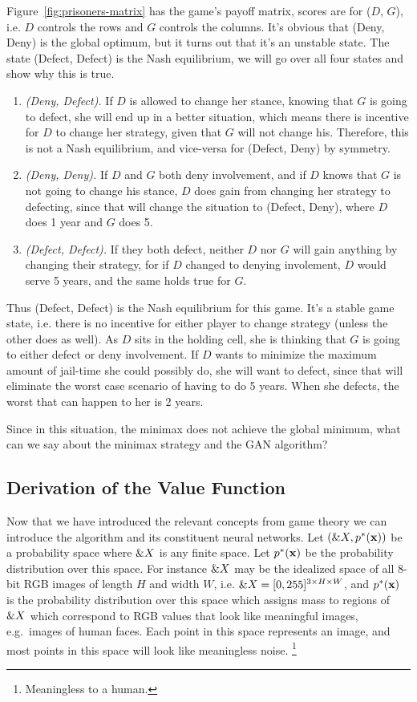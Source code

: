 Figure~\ref{fig:prisoners-matrix} has the game's payoff matrix, scores
are for ($D$, $G$), i.e. $D$ controls the rows and $G$ controls the
columns. It's obvious that (Deny, Deny) is the global optimum, but it
turns out that it's an unstable state. The state (Defect, Defect) is
the Nash equilibrium, we will go over all four states and show why
this is true.

\begin{enumerate}
\item \textit{(Deny, Defect).} If $D$ is allowed to change her stance,
  knowing that $G$ is going to defect, she will end up in a better
  situation, which means there is incentive for $D$ to change her
  strategy, given that $G$ will not change his. Therefore, this is not
  a Nash equilibrium, and vice-versa for (Defect, Deny) by symmetry.
\item \textit{(Deny, Deny).} If $D$ and $G$ both deny involvement, and
  if $D$ knows that $G$ is not going to change his stance, $D$ does
  gain from changing her strategy to defecting, since that will change
  the situation to (Defect, Deny), where $D$ does 1 year and $G$ does
  5.
\item \textit{(Defect, Defect).} If they both defect, neither $D$ nor
  $G$ will gain anything by changing their strategy, for if $D$
  changed to denying involement, $D$ would serve 5 years, and the same
  holds true for $G$.
\end{enumerate}

Thus (Defect, Defect) is the Nash equilibrium for this game. It's a
stable game state, i.e. there is no incentive for either player to
change strategy (unless the other does as well). As $D$ sits in the
holding cell, she is thinking that $G$ is going to either defect or
deny involvement. If $D$ wants to minimize the maximum amount of
jail-time she could possibly do, she will want to defect, since that
will eliminate the worst case scenario of having to do 5 years. When
she defects, the worst that can happen to her is 2 years.

Since in this situation, the minimax does not achieve the global
minimum, what can we say about the minimax strategy and the GAN
algorithm?

\subsection{Derivation of the Value Function}
\label{sec:derivation}

Now that we have introduced the relevant concepts from game theory we
can introduce the algorithm and its constituent neural networks. Let
$(\&X, p^*(\mathbf{x}))$ be a probability space where $\&X$ is any finite
space. Let $p^*(\mathbf{x})$ be the probability distribution over this space. For
instance $\&X$ may be the idealized space of all 8-bit RGB images
of length $H$ and width $W$, i.e.
$\&X = [0, 255]^{3 \times H \times W}$, and $p^*(\mathbf{x})$ is the
probability distribution over this space which assigns mass to regions
of $\&X$ which correspond to RGB values that look like meaningful
images, e.g.\ images of human faces. Each point in this space
represents an image, and most points in this space will look like
meaningless noise. \footnote{Meaningless to a human.}

